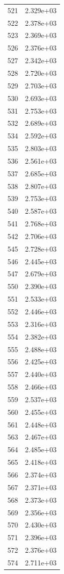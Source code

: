 \documentclass[12pt]{article}
\begin{document}
\begin{longtable}{@{}cc@{}}
521 & 2.329e+03 \\
522 & 2.378e+03 \\
523 & 2.369e+03 \\
526 & 2.376e+03 \\
527 & 2.342e+03 \\
528 & 2.720e+03 \\
529 & 2.703e+03 \\
530 & 2.693e+03 \\
531 & 2.753e+03 \\
532 & 2.689e+03 \\
534 & 2.592e+03 \\
535 & 2.803e+03 \\
536 & 2.561e+03 \\
537 & 2.685e+03 \\
538 & 2.807e+03 \\
539 & 2.753e+03 \\
540 & 2.587e+03 \\
541 & 2.768e+03 \\
542 & 2.706e+03 \\
545 & 2.728e+03 \\
546 & 2.445e+03 \\
547 & 2.679e+03 \\
550 & 2.390e+03 \\
551 & 2.533e+03 \\
552 & 2.446e+03 \\
553 & 2.316e+03 \\
554 & 2.382e+03 \\
555 & 2.488e+03 \\
556 & 2.425e+03 \\
557 & 2.440e+03 \\
558 & 2.466e+03 \\
559 & 2.537e+03 \\
560 & 2.455e+03 \\
561 & 2.448e+03 \\
563 & 2.467e+03 \\
564 & 2.485e+03 \\
565 & 2.418e+03 \\
566 & 2.374e+03 \\
567 & 2.371e+03 \\
568 & 2.373e+03 \\
569 & 2.356e+03 \\
570 & 2.430e+03 \\
571 & 2.396e+03 \\
572 & 2.376e+03 \\
574 & 2.711e+03 \\

\end{longtable}
\end{document}

